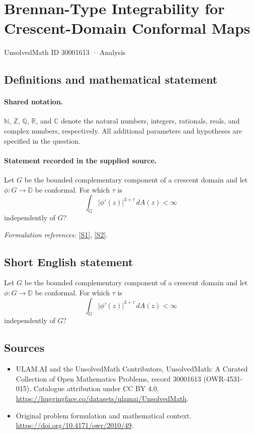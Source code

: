 \documentclass[11pt]{article}
\newcommand{\sref}[2]{\hyperlink{source:#1:#2}{[S#2]}}
\begin{document}
\setcounter{section}{30001612}
\section{Brennan-Type Integrability for Crescent-Domain Conformal Maps}\label{30001613}
{\small UnsolvedMath ID 30001613 · Analysis}
\subsection{Definitions and mathematical statement}

\paragraph{Shared notation.}$\mathbb N$, $\mathbb Z$, $\mathbb Q$, $\mathbb R$, and $\mathbb C$ denote the natural numbers, integers, rationals, reals, and complex numbers, respectively. All additional parameters and hypotheses are specified in the question.


\paragraph{Statement recorded in the supplied source.}
Let $G$ be the bounded complementary component of a crescent domain and let $\phi:G\to\mathbb D$ be conformal. For which $\tau$ is $$\int_G|\phi'(z)|^{3+\tau}\,dA(z)<\infty$$ independently of $G$?
\par\smallskip\textit{Formulation references:} \sref{30001613}{1}, \sref{30001613}{2}.
\subsection{Short English statement}
Let $G$ be the bounded complementary component of a crescent domain and let $\phi:G\to\mathbb D$ be conformal. For which $\tau$ is $$\int_G|\phi'(z)|^{3+\tau}\,dA(z)<\infty$$ independently of $G$?
\subsection{Sources}
\begin{itemize}
\item[\hypertarget{source:30001613:1}{S1}] ULAM.AI and the UnsolvedMath Contributors, UnsolvedMath: A Curated Collection of Open Mathematics Problems, record 30001613 (OWR-4531-015). Catalogue attribution under CC BY 4.0.
\url{https://huggingface.co/datasets/ulamai/UnsolvedMath}.
\item[\hypertarget{source:30001613:2}{S2}] Original problem formulation and mathematical context.
\url{https://doi.org/10.4171/owr/2010/49}.
\end{itemize}
\label{end:30001613}
\end{document}
